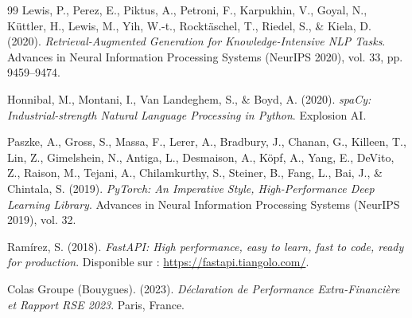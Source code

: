 \documentclass[12pt,a4paper]{report}
\begin{document}
\begin{thebibliography}{99}
Lewis, P., Perez, E., Piktus, A., Petroni, F., Karpukhin, V., Goyal, N., Küttler, H., Lewis, M., Yih, W.-t., Rocktäschel, T., Riedel, S., \& Kiela, D. (2020).
\textit{Retrieval-Augmented Generation for Knowledge-Intensive NLP Tasks}.
Advances in Neural Information Processing Systems (NeurIPS 2020), vol. 33, pp. 9459--9474.

Honnibal, M., Montani, I., Van Landeghem, S., \& Boyd, A. (2020).
\textit{spaCy: Industrial-strength Natural Language Processing in Python}.
Explosion AI.

Paszke, A., Gross, S., Massa, F., Lerer, A., Bradbury, J., Chanan, G., Killeen, T., Lin, Z., Gimelshein, N., Antiga, L., Desmaison, A., Köpf, A., Yang, E., DeVito, Z., Raison, M., Tejani, A., Chilamkurthy, S., Steiner, B., Fang, L., Bai, J., \& Chintala, S. (2019).
\textit{PyTorch: An Imperative Style, High-Performance Deep Learning Library}.
Advances in Neural Information Processing Systems (NeurIPS 2019), vol. 32.

Ramírez, S. (2018).
\textit{FastAPI: High performance, easy to learn, fast to code, ready for production}.
Disponible sur : \url{https://fastapi.tiangolo.com/}.

Colas Groupe (Bouygues). (2023).
\textit{Déclaration de Performance Extra-Financière et Rapport RSE 2023}.
Paris, France.

\end{thebibliography}
\end{document}
